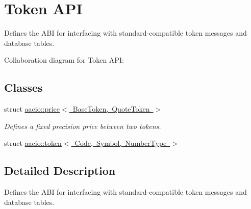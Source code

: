 \hypertarget{group__tokens}{}\section{Token A\+PI}
\label{group__tokens}


Defines the A\+BI for interfacing with standard-\/compatible token messages and database tables.  


Collaboration diagram for Token A\+PI\+:
\subsection*{Classes}
\begin{DoxyCompactItemize}
\item 
struct \mbox{\hyperlink{structaacio_1_1price}{aacio\+::price$<$ Base\+Token, Quote\+Token $>$}}
\begin{DoxyCompactList}\small\item\em Defines a fixed precision price between two tokens. \end{DoxyCompactList}\item 
struct \mbox{\hyperlink{classaacio_1_1token}{aacio\+::token$<$ Code, Symbol, Number\+Type $>$}}
\end{DoxyCompactItemize}


\subsection{Detailed Description}
Defines the A\+BI for interfacing with standard-\/compatible token messages and database tables. 


